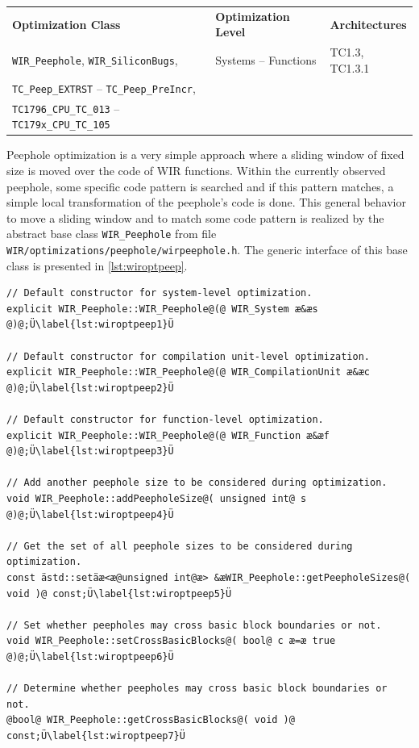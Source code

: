 \begin{tabular}{|l|l|l|}
  \hline
  \textbf{Optimization Class} & \textbf{Optimization Level} & \textbf{Architectures} \\
  \hhline{|=|=|=|}
  \texttt{WIR\_Peephole}, \texttt{WIR\_SiliconBugs}, & Systems -- Functions & TC1.3, TC1.3.1 \\
  \texttt{TC\_Peep\_EXTRST} -- \texttt{TC\_Peep\_PreIncr}, & &  \\
  \texttt{TC1796\_CPU\_TC\_013} -- \texttt{TC179x\_CPU\_TC\_105} & &  \\
  \hline
\end{tabular}

Peephole optimization is a very simple approach where a sliding window of fixed size is moved over the code of \gls{WIR} functions.
Within the currently observed peephole, some specific code pattern is searched and if this pattern matches, a simple local transformation of the peephole's code is done.
This general behavior to move a sliding window and to match some code pattern is realized by the abstract base class \texttt{WIR\_Peephole} from file \texttt{WIR/optimizations/peephole/wirpeephole.h}.
The generic interface of this base class is presented in \cref{lst:wiroptpeep}.

\begin{lstlisting}[style=code,float=!b,caption={Public Interface of Class \texttt{WIR\_Peephole}},label=lst:wiroptpeep]
// Default constructor for system-level optimization.
explicit WIR_Peephole::WIR_Peephole@(@ WIR_System æ&æs @)@;Ü\label{lst:wiroptpeep1}Ü

// Default constructor for compilation unit-level optimization.
explicit WIR_Peephole::WIR_Peephole@(@ WIR_CompilationUnit æ&æc @)@;Ü\label{lst:wiroptpeep2}Ü

// Default constructor for function-level optimization.
explicit WIR_Peephole::WIR_Peephole@(@ WIR_Function æ&æf @)@;Ü\label{lst:wiroptpeep3}Ü

// Add another peephole size to be considered during optimization.
void WIR_Peephole::addPeepholeSize@( unsigned int@ s @)@;Ü\label{lst:wiroptpeep4}Ü

// Get the set of all peephole sizes to be considered during optimization.
const ästd::setäæ<æ@unsigned int@æ> &æWIR_Peephole::getPeepholeSizes@( void )@ const;Ü\label{lst:wiroptpeep5}Ü

// Set whether peepholes may cross basic block boundaries or not.
void WIR_Peephole::setCrossBasicBlocks@( bool@ c æ=æ true @)@;Ü\label{lst:wiroptpeep6}Ü

// Determine whether peepholes may cross basic block boundaries or not.
@bool@ WIR_Peephole::getCrossBasicBlocks@( void )@ const;Ü\label{lst:wiroptpeep7}Ü
\end{lstlisting}

